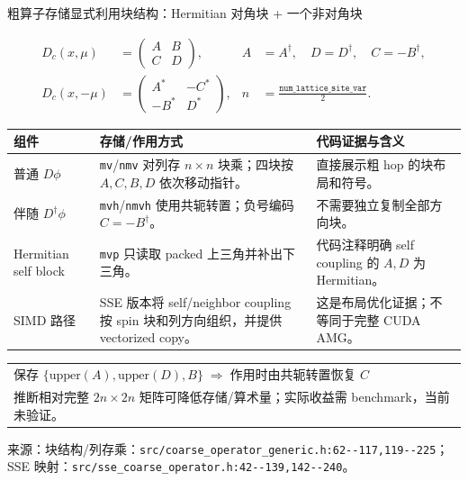 \documentclass[UTF8,aspectratio=169,11pt]{ctexbeamer}
\newcommand{\source}[1]{%
  \vspace{0.06em}\par{\raggedright\scriptsize\color{muted}来源：#1\par}}
\newcommand{\inferred}{\textcolor{accent}{推断}}
\newcommand{\code}[1]{\nolinkurl{#1}}
\newcommand{\denseframe}{%
  \footnotesize
  \setlength{\tabcolsep}{2.5pt}%
  \renewcommand{\arraystretch}{0.76}%
}
\begin{document}
\begin{frame}[t]{粗算子存储显式利用块结构：Hermitian 对角块 + 一个非对角块}
  \denseframe
  \scriptsize
  \begin{align*}
    D_c(x,\mu)&=\begin{pmatrix}A&B\\C&D\end{pmatrix},
    &A&=A^\dagger,\quad D=D^\dagger,\quad C=-B^\dagger,\\
    D_c(x,-\mu)&=\begin{pmatrix}A^\ast&-C^\ast\\-B^\ast&D^\ast\end{pmatrix},
    &n&=\frac{\texttt{num\_lattice\_site\_var}}{2}.
  \end{align*}
  \begin{tabularx}{0.96\textwidth}{@{}p{}p{}Y@{}}
    \toprule
    组件 & 存储/作用方式 & 代码证据与含义 \\
    \midrule
    普通 $D\phi$ & \code{mv}/\code{nmv} 对列存 $n\times n$ 块乘；四块按 $A,C,B,D$ 依次移动指针。 & 直接展示粗 hop 的块布局和符号。 \\
    伴随 $D^\dagger\phi$ & \code{mvh}/\code{nmvh} 使用共轭转置；负号编码 $C=-B^\dagger$。 & 不需要独立复制全部方向块。 \\
    Hermitian self block & \code{mvp} 只读取 packed 上三角并补出下三角。 & 代码注释明确 self coupling 的 $A,D$ 为 Hermitian。 \\
    SIMD 路径 & SSE 版本将 self/neighbor coupling 按 spin 块和列方向组织，并提供 vectorized copy。 & 这是布局优化证据；不等同于完整 CUDA AMG。 \\
    \bottomrule
  \end{tabularx}
  \vspace{0.08cm}
  \begin{tabular}{@{}l@{}}
    $\text{保存 }\{\text{upper}(A),\text{upper}(D),B\}
      \;\Longrightarrow\;\text{作用时由共轭转置恢复 }C$ \\
    \quad\inferred\;相对完整 $2n\times2n$ 矩阵可降低存储/算术量；实际收益需 benchmark，当前未验证。
  \end{tabular}
  \source{块结构/列存乘：\code{src/coarse_operator_generic.h:62--117,119--225}；SSE 映射：\code{src/sse_coarse_operator.h:42--139,142--240}。}
\end{frame}
\end{document}
